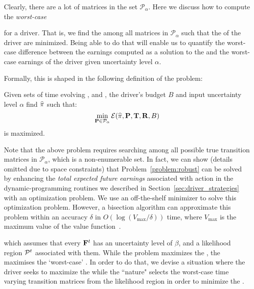 Clearly, there are a lot of matrices in the set $\mathcal{P}_\alpha$.
Here we discuss how to compute the \emph{worst-case}{ {\totalexpectedearnings} for a driver. That is, we find the {\truetransitionmatrix} among all matrices in $\mathcal{P}_\alpha$ such that the {\totalexpectedearnings} of the driver
are minimized. Being able to do that will enable us to 
quantify the worst-case difference between the earnings computed
as a solution to the {\originalproblem} and the worst-case earnings of the
driver given uncertainty level $\alpha$.


Formally, this is shaped in the following definition of the {\robustproblem}
problem:

\begin{problem}[{\robustproblem}]\label{problem:robust}
Given sets of time evolving {\countmatrix}, {\traveltimematrix} and {\rewardsmatrix}, the driver's budget $B$ and input uncertainty level $\alpha$
find $\widehat{\pi}$
such that:
\[
\min_{{\mathbf{P}}\in\mathcal{P}_\alpha}\mathcal{E}(\widehat{\pi},{\mathbf{P}},{\mathbf{T}},{\mathbf{R}},B)
\]
is maximized.
\end{problem}
Note that the above problem requires searching among all possible true transition 
matrices in $\mathcal{P}_\alpha$, which is a non-enumerable set. 
In fact, we can show (details omitted due to space constraints) that 
Problem~\ref{problem:robust} can be solved by enhancing the \emph{total expected future earnings} associated with {\getpassenger} action in the  dynamic-programming routines we described in Section~\ref{sec:driver_strategies}
with an optimization problem. We use an off-the-shelf minimizer to solve this optimization problem. However, a bisection algorithm can approximate this problem within an accuracy $\delta$ in $O(\log(V_{\max}/\delta))$ time, where $V_{\max}$ is the maximum value of the value function~\cite{nilim2004robustness}.

\iffalse
which assumes that every ${{\mathbf{F}}}^t$ has an uncertainty level of $\beta$, and a likelihood region $\mathcal{P}^t$ associated with them. While the {\originalproblem} problem maximizes the {\totalexpectedearnings}, the {\nominalproblem} maximises the `worst-case' {\totalexpectedearnings}. In order to do that, we devise a situation where the driver seeks to maximize the {\totalexpectedearnings} 
while the ``nature" selects the worst-case time varying transition matrices from the likelihood region {\likelihoodregion} in order to minimize the {\totalexpectedearnings}.

}

